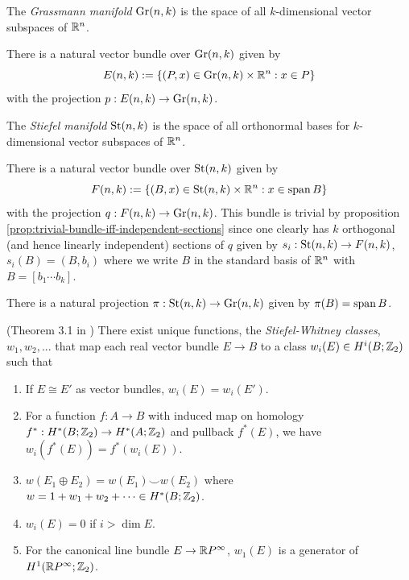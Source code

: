 \begin{definition}
    The \emph{Grassmann manifold} $\operatorname{Gr}(n,k)$ is the space of all $k$-dimensional vector subspaces of $\mathbb{R}^n$.
\end{definition}

\begin{remark}
    There is a natural vector bundle over $\operatorname{Gr}(n,k)$ given by
    \[
        E(n,k) := \left\{ (P,x) \in \operatorname{Gr}(n,k) \times \mathbb{R}^n : x \in P \right\}
    \]
    with the projection $p : E(n,k) \to \operatorname{Gr}(n,k)$.
\end{remark}

\begin{definition}
    The \emph{Stiefel manifold} $\operatorname{St}(n,k)$ is the space of all orthonormal bases for $k$-dimensional vector subspaces of $\mathbb{R}^n$.
\end{definition}

\begin{remark}
    There is a natural vector bundle over $\operatorname{St}(n,k)$ given by
    \[
        F(n,k) := \left\{ (B,x) \in \operatorname{St}(n,k) \times \mathbb{R}^n : x \in \operatorname{span} B \right\}
    \]
    with the projection $q : F(n,k) \to \operatorname{Gr}(n,k)$.
    This bundle is trivial by proposition \ref{prop:trivial-bundle-iff-independent-sections} since one clearly has $k$ orthogonal (and hence linearly independent) sections of $q$ given by $s_i : \operatorname{St}(n,k) \to F(n,k)$, $s_i(B) = (B,b_i)$ where we write $B$ in the standard basis of $\mathbb{R}^n$ with $B = [b_1 \cdots b_k]$.
\end{remark}

\begin{remark}
    There is a natural projection $\pi : \operatorname{St}(n,k) \to \operatorname{Gr}(n,k)$ given by $\pi(B) = \operatorname{span} B$.
\end{remark}

\begin{theorem}\label{thm:SW-class-existence}
    (Theorem 3.1 in \cite{hatcher2009bundlesktheory})
    There exist unique functions, the \emph{Stiefel-Whitney classes}, $w_1,w_2,...$ that map each real vector bundle $E \to B$ to a class $w_i(E) \in H^i(B; \mathbb{Z}_2)$ such that
    \begin{enumerate}
        \item If $E \cong E'$ as vector bundles, $w_i(E) = w_i(E')$.
        \item For a function $f : A \to B$ with induced map on homology $f^* : H^*(B;\mathbb{Z}_2) \to H^*(A;\mathbb{Z}_2)$ and pullback $f^*(E)$, we have $w_i(f^*(E)) = f^*(w_i(E))$.
        \item $w(E_1 \oplus E_2) = w(E_1) \smile w(E_2)$ where $w = 1 + w_1 + w_2 + \cdots \in H^*(B;\mathbb{Z}_2)$.
        \item $w_i(E) = 0$ if $i > \dim E$.
        \item For the canonical line bundle $E \to \mathbb{R} P^\infty$, $w_1(E)$ is a generator of $H^1(\mathbb{R} P^\infty;\mathbb{Z}_2)$.
    \end{enumerate}
\end{theorem}

